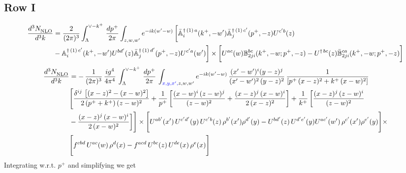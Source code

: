 \documentclass[9pt]{article}
\def\mf#1{\mathbb{#1}}
\numberwithin{equation}{section}
\begin{document}
\subsection{Row I\, }
\begin{align}
 \frac{d^{3}N_{\rm NLO}^{\rm}}{d^{3}k}  & =    \frac{2}{(2\pi)^{3}} \int_{\Lambda}^{\vee - k^{+}}\, \frac{dp^{+}}{2\pi}\int_{z,w,w^{\prime}} e^{-ik(w^{\prime}-w)}\, 
        \bigg[\Bar{\mf{A}}^{\dagger\, (1)\, a}_{i}(k^{+},-w^{\prime})\Bar{\mf{A}}^{\dagger\, (1)\, c^{\prime}}_{j}(p^{+},-z)U^{c^{\prime}b}(z)\notag \\ & -\mf{A}^{\dagger\, (1)\, c^{\prime}}_{i}(k^{+},- w^{\prime})U^{bd^{\prime}}(z)\Bar{\mf{A}}^{\dagger\, (1)\, d^{\prime}}_{j}(p^{+},-z)U^{c^{\prime}a}(w^{\prime})  \bigg]\times \bigg[U^{ac}(w) \mf{B}^{bc}_{2ji}(k^{+},-w;p^{+},-z) -U^{\dagger\, bc}(z)\Bar{\mf{B}}^{ca}_{2ji}(k^{+},-w; p^{+},-z)\bigg] \nonumber
\end{align}
\begin{align}
    \frac{d^{3}N_{\rm NLO}^{\rm}}{d^{3}k}  & =  -\,\frac{1}{(2\pi)^{3}}\,\frac{ig^{4}}{4\pi^{4}}\, \int_{\Lambda}^{\vee-k^{+}}\, \frac{dp^{+}}{2\pi}\, \int_{{\color{blue}x,y,x^{\prime},} z,w,w^{\prime}} e^{-ik(w^{\prime}-w)}\, \frac{(x'-w')^{i}(y-z)^{j}}{(x'-w')^{2}\,(y-z)^{2}}\, \frac{1}{\left[p^{+}\,(x-z)^{2}+k^{+}\,(x-w)^{2}\right]}\notag \\ & \Bigg[\frac{\delta^{ij}\, \left[(x-z)^{2}-(x-w)^{2}\right]}{2\, (p^{+}+k^{+})\,(z-w)^{2}}+\frac{1}{p^{+}}\, \bigg[\frac{(x-w)^{i}\,(z-w)^{j}}{(z-w)^{2}}+\frac{(x-z)^{j}\,(x-w)^{i}}{2\,(x-z)^{2}}\bigg]+\frac{1}{k^{+}}\,\bigg[\frac{(x-z)^{j}\,(z-w)^{i}}{(z-w)^{2}}\notag \\ & -\frac{(x-z)^{j}\,(x-w)^{i}}{2\,(x-w)^{2}}\bigg]\Bigg]\times \Bigg[U^{ab'}(x')\,U^{c'd'}(y)\,U^{c'b}(z)\,\rho^{b'}(x')\rho^{d'}(y)-U^{bd'}(z)\,U^{d'e'}(y)U^{ac'}(w')\,\rho^{c'}(x')\rho^{e'}(y)\Bigg]\times \notag \\ & \Bigg[f^{cbd}\,U^{ac}(w)\,\rho^{d}(x)-f^{acd}\, U^{bc}(z)\,U^{de}(x)\,\rho^{e}(x)\Bigg]
\end{align}
Integrating w.r.t. $p^{+}$ and simplifying we get
\end{document}
